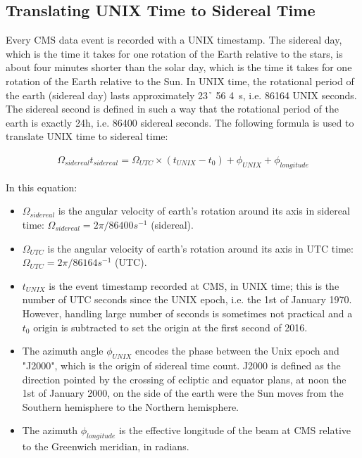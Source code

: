 \subsection{Translating UNIX Time to Sidereal Time}
Every CMS data event is recorded with a UNIX timestamp. 
The sidereal day, which is the time it takes for one rotation of the Earth relative to the stars, is about four minutes shorter than the solar day, which is the time it takes for one rotation of the Earth relative to the Sun.
In UNIX time, the rotational period of the earth (sidereal day) lasts approximately \SI{23}{\h} \SI{56}{\min} \SI{4}{\s}, i.e. 86164 UNIX seconds. 
The sidereal second is defined in such a way that the rotational period of the earth is exactly 24h, i.e. 86400 sidereal seconds.
The following formula is used to translate UNIX time to sidereal time:
\begin{linenomath*}
\begin{align}
\Omega_{sidereal} t_{sidereal} = \Omega_{UTC} \times (t_{UNIX} - t_0) + \phi_{UNIX} + \phi_{longitude}
\end{align}
\end{linenomath*}
In this equation:
\begin{itemize}
\item $\Omega_{sidereal}$ is the angular velocity of earth's rotation around its axis in sidereal time: $\Omega_{sidereal} = 2\pi / 86400 s^{-1}$ (sidereal). 
\item $\Omega_{UTC}$ is the angular velocity of earth's rotation around its axis in UTC time: $\Omega_{UTC} = 2\pi / 86164 s^{-1}$ (UTC). 
\item $t_{UNIX}$ is the event timestamp recorded at CMS, in UNIX time; this is the number of UTC seconds since the UNIX epoch, i.e. the 1st of January 1970. However, handling large number of seconds is sometimes not practical and a $t_0$ origin is subtracted to set the origin at the first second of 2016.
\item The azimuth angle $\phi_{UNIX}$ encodes the phase between the Unix epoch and "J2000", which is the origin of sidereal time count. J2000 is defined as the direction pointed by the crossing of ecliptic and equator plans, at noon the 1st of January 2000, on the side of the earth were the Sun moves from the Southern hemisphere to the Northern hemisphere. 
\item The azimuth $\phi_{longitude}$ is the effective longitude of the beam at CMS relative to the Greenwich meridian, in radians.
\end{itemize}

